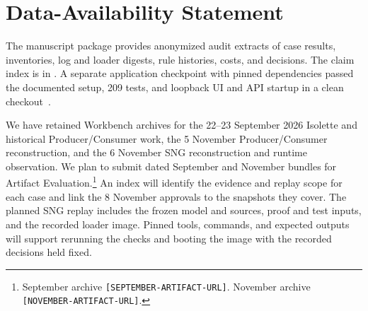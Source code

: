 \section*{Data-Availability Statement}
\label{sec:data-availability}
The manuscript package provides anonymized audit extracts of case results, inventories, log and loader digests, rule histories, costs, and decisions. The claim index is in . A separate application checkpoint with pinned dependencies passed the documented setup, 209 tests, and loopback UI and API startup in a clean checkout~\cite{scpCheckpoint,checkpointBuild}.

We have retained Workbench archives for the 22--23 September 2026 Isolette and historical Producer/\allowbreak{}Consumer work, the 5 November Producer/\allowbreak{}Consumer reconstruction, and the 6 November SNG reconstruction and runtime observation. We plan to submit dated September and November bundles for Artifact Evaluation.\footnote{September archive \texttt{[SEPTEMBER-ARTIFACT-URL]}. November archive \texttt{[NOVEMBER-ARTIFACT-URL]}.} An index will identify the evidence and replay scope for each case and link the 8 November approvals to the snapshots they cover. The planned SNG replay includes the frozen model and sources, proof and test inputs, and the recorded loader image. Pinned tools, commands, and expected outputs will support rerunning the checks and booting the image with the recorded decisions held fixed.
